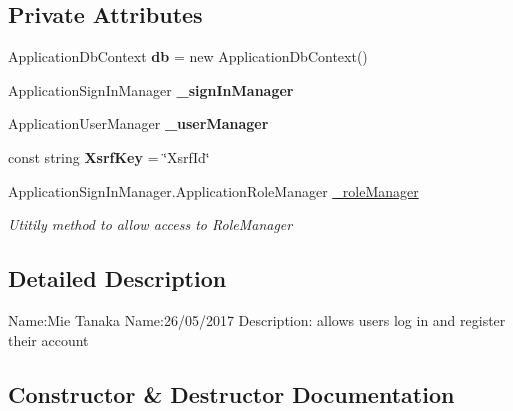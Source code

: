 \subsection*{Private Attributes}
\begin{DoxyCompactItemize}
\item 
\mbox{\label{class_alfa_accounting_1_1_controllers_1_1_account_controller_a879b7c9b7b0835f6c03365d83f346a0a}} 
Application\+Db\+Context {\bfseries db} = new Application\+Db\+Context()
\item 
\mbox{\label{class_alfa_accounting_1_1_controllers_1_1_account_controller_a5bfac4ebeaa597bc2681ba392adb455a}} 
Application\+Sign\+In\+Manager {\bfseries \+\_\+sign\+In\+Manager}
\item 
\mbox{\label{class_alfa_accounting_1_1_controllers_1_1_account_controller_aab890e510d97ecbf226a14833fbc02d7}} 
Application\+User\+Manager {\bfseries \+\_\+user\+Manager}
\item 
\mbox{\label{class_alfa_accounting_1_1_controllers_1_1_account_controller_a4246449469968efb41f0b5b4c6d19bf0}} 
const string {\bfseries Xsrf\+Key} = \char`\"{}Xsrf\+Id\char`\"{}
\item 
Application\+Sign\+In\+Manager.\+Application\+Role\+Manager \hyperlink{class_alfa_accounting_1_1_controllers_1_1_account_controller_a312898ad37c6e9c3c3a188110563508b}{\+\_\+role\+Manager}
\begin{DoxyCompactList}\small\item\em Utitily method to allow access to Role\+Manager \end{DoxyCompactList}\end{DoxyCompactItemize}


\subsection{Detailed Description}
Name\+:Mie Tanaka Name\+:26/05/2017 Description\+: allows users log in and register their account 



\subsection{Constructor \& Destructor Documentation}
\mbox{\label{class_alfa_accounting_1_1_controllers_1_1_account_controller_a31bb8afad3df5a35af60d598886942d2}} 

